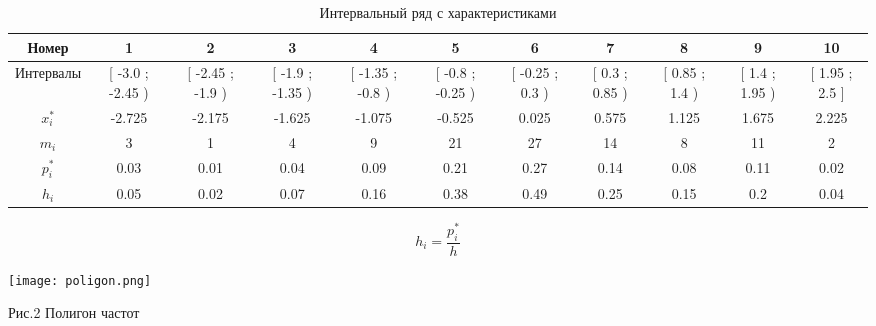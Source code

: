 \documentclass{article}
\begin{document}
\begin{table}[h]
    \scriptsize
    \begin{tabular}{|*{11}{c|}}
        \hline
        Номер & 1  & 2  & 3  & 4  & 5  & 6  & 7  & 8  & 9  & 10 \\
        \hline
        Интервалы &\tiny[ -3.0 ; -2.45 )& \tiny[ -2.45 ; -1.9 ) & \tiny[ -1.9 ; -1.35 ) & \tiny[ -1.35 ; -0.8 ) & \tiny[ -0.8 ; -0.25 ) & \tiny[ -0.25 ; 0.3 ) & \tiny[ 0.3 ; 0.85 ) & \tiny[ 0.85 ; 1.4 ) & \tiny[ 1.4 ; 1.95 ) & \tiny[ 1.95 ; 2.5 ] \\
        \hline
        $x_i^*$& -2.725 &-2.175 &-1.625 &-1.075 &-0.525 &0.025 &0.575 &1.125 &1.675 &2.225\\
        \hline
        $m_i$& 3 &1 &4 &9 &21 &27 &14 &8 &11 &2\\
        \hline
        $p_i^*$& 0.03 &0.01 &0.04 &0.09 &0.21 &0.27 &0.14 &0.08 &0.11 &0.02\\
        \hline
        $h_i$& 0.05 &0.02 &0.07 &0.16 &0.38 &0.49 &0.25 &0.15 &0.2 &0.04\\
        \hline
    \end{tabular}
    \caption{Интервальный ряд с характеристиками}
\end{table}
\[h_i = \frac{p_i^*}{h}\]
\begin{center}
    \texttt{[image: poligon.png]}
\end{center}

\begin{center}
    \small
    Рис.2 Полигон частот
\end{center}
\newblock
\end{document}
